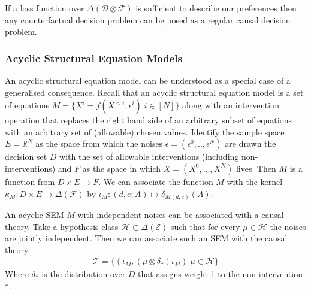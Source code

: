 If a loss function over $\Delta(\mathcal{D}\otimes\mathcal{F})$ is sufficient to describe our preferences then any counterfactual decision problem can be posed as a regular causal decision problem.

\subsubsection{Acyclic Structural Equation Models}

An acyclic structural equation model can be understood as a special case of a generalised consequence. Recall that an acyclic structural equation model is a set of equations $M=\{X^i = f(X^{<i},\epsilon^i)|i\in[N]\}$ along with an intervention operation that replaces the right hand side of an arbitrary subset of equations with an arbitrary set of (allowable) chosen values. Identify the sample space $E=\mathbb{R}^N$ as the space from which the noises $\epsilon=(\epsilon^0,..,\epsilon^N)$ are drawn the decision set $D$ with the set of allowable interventions (including non-interventions) and $F$ as the space in which $X=(X^0,...,X^N)$ lives. Then $M$ is a function from $D\times E\to F$. We can associate the function $M$ with the kernel $\kappa_M: D\times E\to \Delta(\mathcal{F})$ by $\iota_M:(d,e;A)\mapsto \delta_{M(d,e)}(A)$.

An acyclic SEM $M$ with independent noises can be associated with a causal theory. Take a hypothesis class $\mathscr{H}\subset\Delta(\mathcal{E})$ such that for every $\mu\in\mathscr{H}$ the noises are jointly independent. Then we can associate such an SEM with the causal theory
\begin{align}
    \mathscr{T} = \{(\iota_M,(\mu\otimes \delta_*)\iota_M )|\mu\in\mathscr{H}\}
\end{align}
Where $\delta_*$ is the distribution over $D$ that assigns weight 1 to the non-intervention $*$.